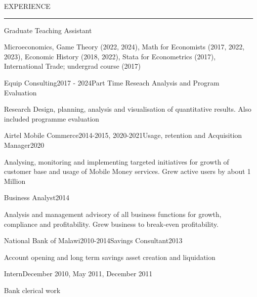 \documentclass{resume} %
\renewenvironment{rSection}[1]{
\sectionskip
\textcolor{RoyalPurple}{\MakeUppercase{#1}}
\sectionlineskip
\hrule
\begin{list}{}{
\setlength{\leftmargin}{1.5em}
}
\item[]
}{
\end{list}
}
\begin{document}
\begin{rSection}{Experience}
\begin{rSubsection}{}{}{Graduate Teaching Assistant}{}
\item Microeconomics, Game Theory (2022, 2024),  Math for Economists (2017, 2022, 2023), Economic History (2018, 2022), Stata for Econometrics (2017), International Trade; undergrad course (2017)

\end{rSubsection}

\begin{rSubsection}{Equip Consulting}{2017 - 2024}{Part Time Reseach Analysis and Program Evaluation }{}
\item Research Design, planning, analysis and visualisation of quantitative results. Also included programme evaluation 

\end{rSubsection}


\begin{rSubsection}{Airtel Mobile Commerce}{2014-2015, 2020-2021}{Usage, retention and Acquisition Manager}{2020}
\item Analysing, monitoring and implementing targeted
initiatives for growth of customer base and usage of Mobile Money services. Grew active users by about 1 Million
\end{rSubsection}

\vspace{-1em}

\begin{rSubsection}{}{}{Business Analyst}{2014}

\item Analysis and management advisory of all business functions for growth, compliance and profitability. Grew business to break-even profitability.

\end{rSubsection}

\begin{rSubsection}{National Bank of Malawi}{2010-2014}{Savings Consultant}{2013}
\item Account opening and long term savings asset creation and liquidation 
\end{rSubsection}
\vspace{-2em}

\begin{rSubsection}{}{}{Intern}{December 2010, May 2011, December 2011}
\item Bank clerical work
\end{rSubsection}

\end{rSection}
\end{document}
